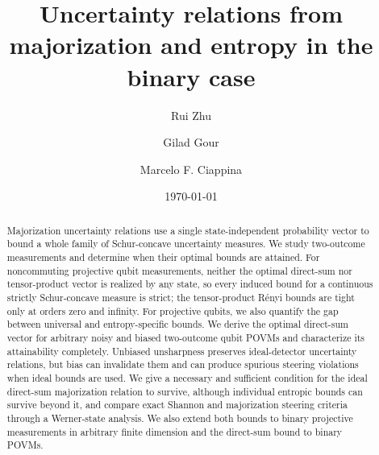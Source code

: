\documentclass[aps,pra,twocolumn,superscriptaddress,nofootinbib,floatfix]{revtex4-2}
\theoremstyle{definition}
\begin{document}
\title{Uncertainty relations from majorization and entropy in the binary case}

\author{Rui Zhu}

\author{Gilad Gour}

\author{Marcelo F. Ciappina}

\date{\today}

\begin{abstract}
Majorization uncertainty relations use a single state-independent probability
vector to bound a whole family of Schur-concave uncertainty measures. We study
two-outcome measurements and determine when their optimal bounds are attained.
For noncommuting projective qubit measurements, neither the optimal direct-sum
nor tensor-product vector is realized by any state, so every induced bound for a
continuous strictly Schur-concave measure is strict; the tensor-product R\'enyi
bounds are tight only at orders zero and infinity. For projective qubits, we also
quantify the gap between universal and entropy-specific bounds. We derive the
optimal direct-sum vector for arbitrary noisy and biased two-outcome qubit POVMs
and characterize its attainability completely. Unbiased unsharpness preserves
ideal-detector uncertainty relations, but bias can invalidate them and can
produce spurious steering violations when ideal bounds are used. We give a
necessary and sufficient condition for the ideal direct-sum majorization relation
to survive, although individual entropic bounds can survive beyond it, and
compare exact Shannon and majorization steering criteria through a Werner-state
analysis. We
also extend both bounds to binary projective measurements in arbitrary finite
dimension and the direct-sum bound to binary POVMs.
\end{abstract}
\end{document}

